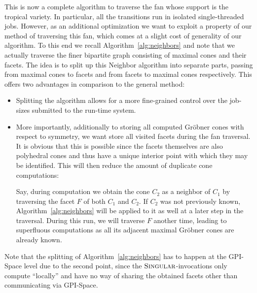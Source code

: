 \documentclass[
  paper=a4,
  titlepage,
  bibliography=totoc,
  listof=totoc,
  pagesize=pdftex
]{scrartcl}
\numberwithin{figure}{section}
\numberwithin{equation}{section}
\numberwithin{table}{section}
\theoremstyle{definition}
\numberwithin{definition}{section}
\begin{document}
This is now a complete algorithm to traverse the fan whose support is the tropical
variety. In particular, all the transitions run in isolated single-threaded jobs. However,
as an additional optimization we want to exploit a property of our method of traversing
this fan, which comes at a slight cost of generality of our algorithm. To this end we
recall Algorithm~\ref{alg:neighbors} and note that we actually traverse the finer
bipartite graph consisting of maximal cones and their facets. The idea is to split up this
Neighbor algorithm into separate parts, passing from maximal cones to facets and from
facets to maximal cones respectively. This offers two advantages in comparison to the
general method:
\begin{itemize}
  \item Splitting the algorithm allows for a more fine-grained control over the job-sizes
    submitted to the run-time system. %
  \item More importantly, additionally to storing all computed Gröbner cones with respect
    to symmetry, we want store all visited facets during the fan traversal. It is obvious
    that this is possible since the facets themselves are also polyhedral cones and thus
    have a unique interior point with which they may be identified. This will then reduce
    the amount of duplicate cone computations:

    Say, during computation we obtain the cone $C_2$ as a neighbor of $C_1$ by traversing
    the facet $F$ of both $C_1$ and $C_2$. If $C_2$ was not previously known,
    Algorithm~\ref{alg:neighbors} will be applied to it as well at a later step in the
    traversal. During this run, we will traverse $F$ another time, leading to superfluous
    computations as all its adjacent maximal Gröbner cones are already known.
\end{itemize}
Note that the splitting of Algorithm~\ref{alg:neighbors} has to happen at the GPI-Space
level due to the second point, since the $\textsc{Singular}$-invocations only compute
\enquote{locally} and have no way of sharing the obtained facets other than communicating
via GPI-Space.
\end{document}
